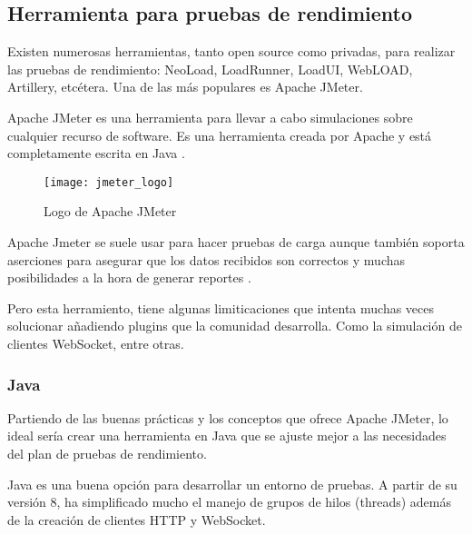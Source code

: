 \subsection{Herramienta para pruebas de rendimiento}

Existen numerosas herramientas, tanto open source como privadas, para realizar las pruebas de rendimiento: NeoLoad, LoadRunner, LoadUI, WebLOAD, Artillery, etcétera. Una de las más populares es Apache JMeter.

Apache JMeter es una herramienta para llevar a cabo simulaciones sobre cualquier recurso de software. Es una herramienta creada por Apache y está completamente escrita en Java \cite{jmeter14}.

\begin{figure}[htp!]
  \centering
  \texttt{[image: jmeter\_logo]}
  \caption{Logo de Apache JMeter}
  \label{fig:jmeter_logo}
\end{figure}

Apache Jmeter se suele usar para hacer pruebas de carga aunque también soporta aserciones para asegurar que los datos recibidos son correctos y muchas posibilidades a la hora de generar reportes \cite{jmeter14}.

Pero esta herramiento, tiene algunas limiticaciones que intenta muchas veces solucionar añadiendo plugins que la comunidad desarrolla. Como la simulación de clientes WebSocket, entre otras.

\subsubsection{Java}

Partiendo de las buenas prácticas y los conceptos que ofrece Apache JMeter, lo ideal sería crear una herramienta en Java que se ajuste mejor a las necesidades del plan de pruebas de rendimiento.

Java es una buena opción para desarrollar un entorno de pruebas. A partir de su versión 8, ha simplificado mucho el manejo de grupos de hilos (threads) además de la creación de clientes HTTP y WebSocket.


